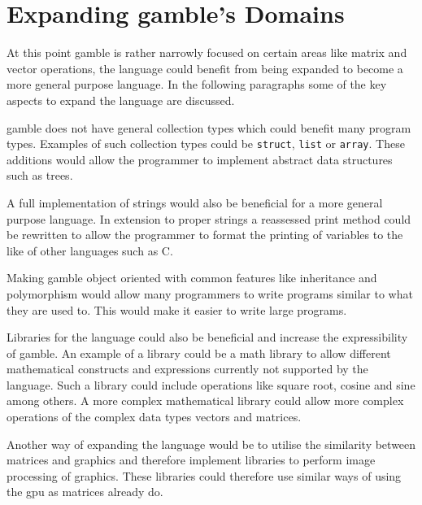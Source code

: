 \section{Expanding \gls{gamble}'s Domains}
At this point \gls{gamble} is rather narrowly focused on certain areas like matrix and vector operations, the language could benefit from being expanded to become a more general purpose language.
In the following paragraphs some of the key aspects to expand the language are discussed.

\gls{gamble} does not have general collection types which could benefit many program types.
Examples of such collection types could be \texttt{struct}, \texttt{list} or \texttt{array}.
These additions would allow the programmer to implement abstract data structures such as trees.

A full implementation of strings would also be beneficial for a more general purpose language.
In extension to proper strings a reassessed print method could be rewritten to allow the programmer to format the printing of variables to the like of other languages such as C.

Making \gls{gamble} object oriented with common features like inheritance and polymorphism would allow many programmers to write programs similar to what they are used to.
This would make it easier to write large programs.

Libraries for the language could also be beneficial and increase the expressibility of \gls{gamble}.
An example of a library could be a math library to allow different mathematical constructs and expressions currently not supported by the language.
Such a library could include operations like square root, cosine and sine among others.
A more complex mathematical library could allow more complex operations of the complex data types vectors and matrices.

Another way of expanding the language would be to utilise the similarity between matrices and graphics and therefore implement libraries to perform image processing of graphics.
These libraries could therefore use similar ways of using the \acrshort{gpu} as matrices already do.
